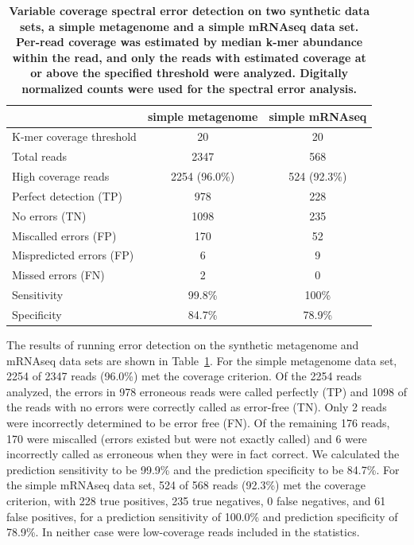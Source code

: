 \documentclass{article}
\begin{document}

\begin{table}
\begin{tabular}{|l|c||c|}
\hline
& {\bf simple metagenome} & {\bf simple mRNAseq} \\
\hline
K-mer coverage threshold & 20 & 20 \\
Total reads & 2347 & 568 \\
High coverage reads & 2254 (96.0\%) & 524 (92.3\%) \\
\hline
Perfect detection (TP) & 978 & 228 \\
No errors (TN) & 1098 & 235 \\
Miscalled errors (FP) & 170 & 52 \\
Mispredicted errors (FP) & 6 & 9 \\
Missed errors (FN) & 2 & 0 \\
\hline
Sensitivity & 99.8\% & 100\% \\
Specificity & 84.7\% & 78.9\% \\
\hline
\end{tabular}

\caption{{\bf Variable coverage spectral error detection on two synthetic
  data sets, a simple metagenome and a simple mRNAseq data set.
  Per-read coverage was estimated by median k-mer abundance within the
  read, and only the reads with estimated coverage at or above the
  specified threshold were analyzed.  Digitally normalized counts were
  used for the spectral error analysis.}}
\label{tab:spectra_variable}
\end{table}

The results of running error detection on the synthetic metagenome and
mRNAseq data sets are shown in Table~\ref{tab:spectra_variable}. For the
simple metagenome data set, 2254 of 2347 reads (96.0\%) met the
coverage criterion.  Of the 2254 reads analyzed, the errors in 978
erroneous reads were called perfectly (TP) and 1098 of the reads with
no errors were correctly called as error-free (TN).  Only 2 reads were
incorrectly determined to be error free (FN).  Of the remaining 176
reads, 170 were miscalled (errors existed but were not exactly called)
and 6 were incorrectly called as erroneous when they were in fact
correct.  We calculated the prediction sensitivity to be 99.9\% and
the prediction specificity to be 84.7\%.  For the simple mRNAseq data
set, 524 of 568 reads (92.3\%) met the coverage criterion, with 228
true positives, 235 true negatives, 0 false negatives, and 61 false
positives, for a prediction sensitivity of 100.0\% and prediction
specificity of 78.9\%.  In neither case were low-coverage reads
included in the statistics.
\end{document}
